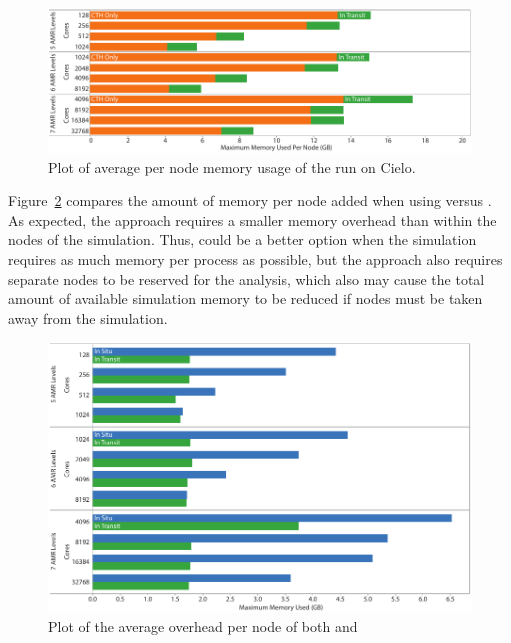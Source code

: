 \begin{figure}[htb]
  \centering
  \includegraphics[width=\linewidth]{figures/MemoryUsageInTransitPerNode}
  \caption{Plot of average per node memory usage of the \intransit run on Cielo.}
  \label{fig:MemoryInTransitPerNode}
\end{figure}

Figure~\ref{fig:MemoryCompare} compares the amount of memory per node added
when using \insitu versus \intransit.  As expected, the \intransit approach
requires a smaller memory overhead than \insitu within the nodes of the
simulation.  Thus, \intransit could be a better option when the simulation
requires as much memory per process as possible, but the \intransit
approach also requires separate nodes to be reserved for the analysis,
which also may cause the total amount of available simulation memory to be
reduced if nodes must be taken away from the simulation.

\begin{figure}[htb]
  \centering
  \includegraphics[width=\linewidth]{figures/MemoryUsageCompare}
  \caption{Plot of the average overhead per node of both \insitu and \intransit}
  \label{fig:MemoryCompare}
\end{figure}


